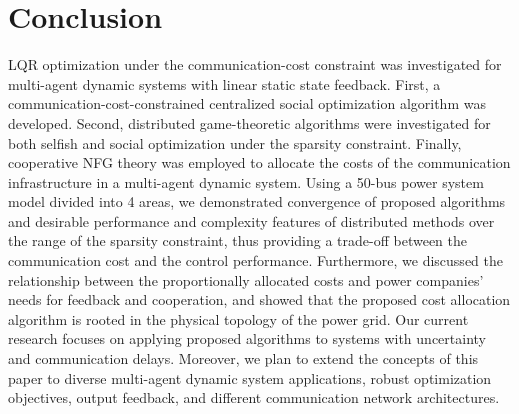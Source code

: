 \documentclass[12pt, draftclsnofoot,onecolumn]{IEEEtran}
\begin{document}
 
 




























																									















\section{Conclusion}

LQR optimization under the communication-cost constraint was investigated for multi-agent dynamic systems with linear static state feedback. First, a communication-cost-constrained centralized social optimization algorithm was developed. Second, distributed game-theoretic algorithms were investigated for both selfish and social optimization under the sparsity constraint. Finally, cooperative NFG theory was employed to allocate the costs of the communication infrastructure in a multi-agent dynamic system. Using a 50-bus power system model divided into 4 areas, we demonstrated convergence of proposed algorithms and desirable performance and complexity features of distributed methods over the range of the sparsity constraint, thus providing a trade-off between the communication cost and the control performance. Furthermore, we discussed the relationship between the proportionally allocated costs and power companies' needs for feedback and cooperation, and showed that the proposed cost allocation algorithm is rooted in the physical topology of the power grid. Our current research focuses on applying proposed algorithms to systems with uncertainty and communication delays. Moreover, we plan to extend the concepts of this paper to diverse multi-agent dynamic system applications, robust optimization objectives, output feedback, and different communication network architectures.
\end{document}
